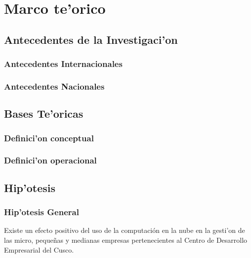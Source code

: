 %
%

\chapter{Marco te'orico}

\section{Antecedentes de la Investigaci'on}

\subsection{Antecedentes Internacionales}

\subsection{Antecedentes Nacionales}

\section{Bases Te'oricas}

\subsection{Definici'on conceptual}

\subsection{Definici'on operacional}

\section{Hip'otesis}

\subsection{Hip'otesis General}

Existe un efecto positivo del uso de la computaci\'on en la nube en la
gesti'on de las micro, peque\~nas y medianas empresas pertenecientes al Centro de
Desarrollo Empresarial del Cusco.

